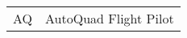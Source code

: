 \begin{table}[H]
\hspace{-9pt}	%
\begin{tabular}{p{} p{}} %
 AQ		&	AutoQuad Flight Pilot
\end{tabular}
\end{table}